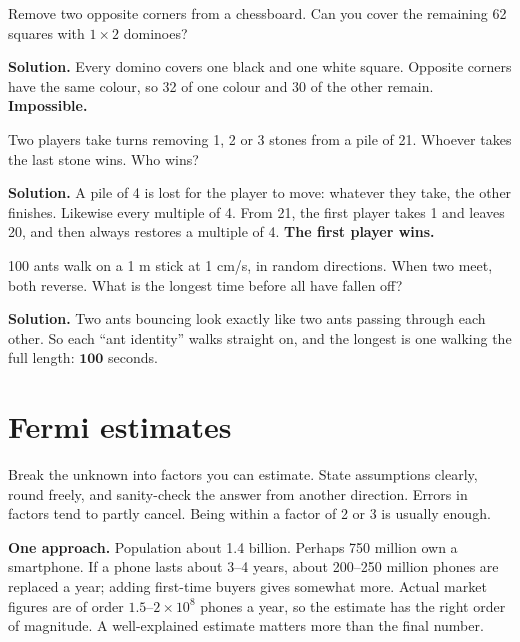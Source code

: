 \documentclass[11pt,a4paper,openany]{report}
\begin{document}
\begin{example}
Remove two opposite corners from a chessboard. Can you cover the remaining 62 squares with $1\times2$ dominoes?

\textbf{Solution.} Every domino covers one black and one white square. Opposite corners have the same colour, so 32 of one colour and 30 of the other remain. \textbf{Impossible.}
\end{example}

\begin{example}
Two players take turns removing 1, 2 or 3 stones from a pile of 21. Whoever takes the last stone wins. Who wins?

\textbf{Solution.} A pile of 4 is lost for the player to move: whatever they take, the other finishes. Likewise every multiple of 4. From 21, the first player takes 1 and leaves 20, and then always restores a multiple of 4. \textbf{The first player wins.}
\end{example}

\begin{example}
100 ants walk on a 1 m stick at 1 cm/s, in random directions. When two meet, both reverse. What is the longest time before all have fallen off?

\textbf{Solution.} Two ants bouncing look exactly like two ants passing through each other. So each ``ant identity'' walks straight on, and the longest is one walking the full length: $\mathbf{100}$ seconds.
\end{example}

\section{Fermi estimates}
\begin{idea}[Method]
Break the unknown into factors you can estimate. State assumptions clearly, round freely, and sanity-check the answer from another direction. Errors in factors tend to partly cancel. Being within a factor of 2 or 3 is usually enough.
\end{idea}
\begin{example}
\textbf{One approach.} Population about 1.4 billion. Perhaps 750 million own a smartphone. If a phone lasts about 3--4 years, about 200--250 million phones are replaced a year; adding first-time buyers gives somewhat more. Actual market figures are of order $1.5$--$2\times10^8$ phones a year, so the estimate has the right order of magnitude. A well-explained estimate matters more than the final number.
\end{example}
\end{document}
